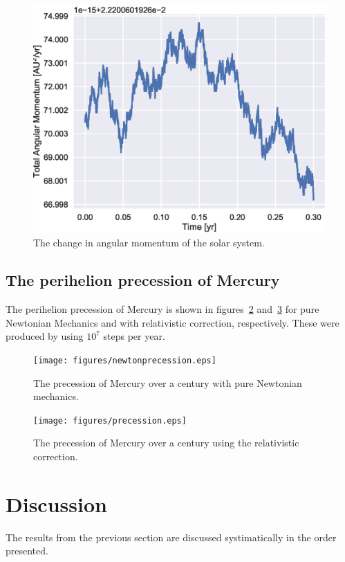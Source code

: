 \documentclass[aps,reprint]{revtex4-1}
\begin{document}
\begin{figure}[H]
  \centering
  \includegraphics[width=\columnwidth]{figures/fullsystem_ang.eps}
  \caption{\label{fig:fullsystemang} The change in angular momentum of the solar
  system.}
\end{figure}


\subsection{The perihelion precession of Mercury}

The perihelion precession of Mercury is shown in figures~\ref{fig:newtonper}
and~\ref{fig:relatper} for pure Newtonian Mechanics and with relativistic
correction, respectively. These were produced by using \(10^{7}\) steps per year.

\begin{figure}[H]
  \centering
  \texttt{[image: figures/newtonprecession.eps]}
  \caption{\label{fig:newtonper} The precession of Mercury over a century with
    pure Newtonian mechanics.}
\end{figure}

\begin{figure}[H]
  \centering
  \texttt{[image: figures/precession.eps]}
  \caption{\label{fig:relatper} The precession of Mercury over a century using
    the relativistic correction.}
\end{figure}


\section{Discussion}
\label{sec:discussion}
The results from the previous section are discussed systimatically in the order
presented.
\end{document}
